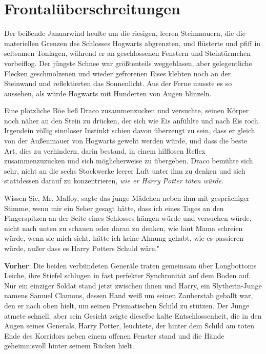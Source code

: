 \chapter{Frontalüberschreitungen}

Der beißende Januarwind heulte um die riesigen, leeren Steinmauern, die die
materiellen Grenzen des Schlosses Hogwarts abgrenzten, und flüsterte und pfiff
in seltsamen Tonlagen, während er an geschlossenen Fenstern und Steintürmchen
vorbeiflog. Der jüngste Schnee war größtenteils weggeblasen, aber gelegentliche
Flecken geschmolzenen und wieder gefrorenen Eises klebten noch an der Steinwand
und reflektierten das Sonnenlicht. Aus der Ferne musste es so aussehen, als
würde Hogwarts mit Hunderten von Augen blinzeln.

Eine plötzliche Böe ließ Draco zusammenzucken und versuchte, seinen Körper noch
näher an den Stein zu drücken, der sich wie Eis anfühlte und nach Eis roch.
Irgendein völlig sinnloser Instinkt schien davon überzeugt zu sein, dass er
gleich von der Außenmauer von Hogwarts geweht werden würde, und dass die beste
Art, dies zu verhindern, darin bestand, in einem hilflosen Reflex
zusammenzuzucken und sich möglicherweise zu übergeben. Draco bemühte sich sehr,
nicht an die sechs Stockwerke leerer Luft unter ihm zu denken und sich
stattdessen darauf zu konzentrieren, \emph{wie er Harry Potter töten würde.}

\glqq{}Wissen Sie, Mr. Malfoy\grqq{}, sagte das junge Mädchen neben ihm mit
gesprächiger Stimme, \glqq{}wenn mir ein Seher gesagt hätte, dass ich eines Tages
an den Fingerspitzen an der Seite eines Schlosses hängen würde und versuchen
würde, nicht nach unten zu schauen oder daran zu denken, wie laut Mama schreien
würde, wenn sie mich sieht, hätte ich keine Ahnung gehabt, wie es passieren
würde, außer dass es Harry Potters Schuld wäre."

\textbf{Vorher}: Die beiden verbündeten Generäle traten gemeinsam über
Longbottoms Leiche, ihre Stiefel schlugen in fast perfekter Synchronität auf dem
Boden auf. Nur ein einziger Soldat stand jetzt zwischen ihnen und Harry, ein
Slytherin-Junge namens Samuel Clamons, dessen Hand weiß um seinen Zauberstab
geballt war, den er nach oben hielt, um seinen Prismatischen Schild zu stützen.
Der Junge atmete schnell, aber sein Gesicht zeigte dieselbe kalte
Entschlossenheit, die in den Augen seines Generals, Harry Potter, leuchtete, der
hinter dem Schild am toten Ende des Korridors neben einem offenen Fenster stand
und die Hände geheimnisvoll hinter seinem Rücken hielt.

